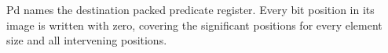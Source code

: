 Pd names the destination packed predicate register.  Every bit position in its
image is written with zero, covering the significant positions for every
element size and all intervening positions.
